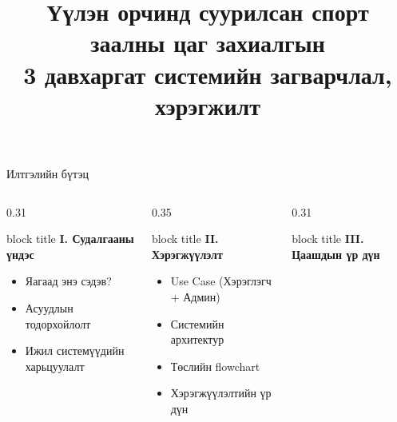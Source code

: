 \documentclass[14pt,aspectratio=169]{beamer}
\title[Спорт заалны цаг захиалгын систем]{%
  Үүлэн орчинд суурилсан спорт заалны цаг захиалгын\\
  3 давхаргат системийн загварчлал, хэрэгжилт}
\author{}
\institute{}
\date{}
\begin{document}

\begin{frame}[plain]
  \titlepage
\end{frame}

\begin{frame}{Илтгэлийн бүтэц}
  \begin{columns}[T]
    \begin{column}{0.31\textwidth}
      \begin{beamercolorbox}[sep=6pt,rounded=true]{block title}
        \centering\textbf{I. Судалгааны үндэс}
      \end{beamercolorbox}
      \vspace{4pt}
      \small
      \begin{itemize}
        \item Яагаад энэ сэдэв?
        \item Асуудлын тодорхойлолт
        \item Ижил системүүдийн харьцуулалт
      \end{itemize}
    \end{column}
    \begin{column}{0.35\textwidth}
      \begin{beamercolorbox}[sep=6pt,rounded=true]{block title}
        \centering\textbf{II. Хэрэгжүүлэлт}
      \end{beamercolorbox}
      \vspace{4pt}
      \small
      \begin{itemize}
        \item Use Case (Хэрэглэгч + Админ)
        \item Системийн архитектур
        \item Төслийн flowchart
        \item Хэрэгжүүлэлтийн үр дүн
      \end{itemize}
    \end{column}
    \begin{column}{0.31\textwidth}
      \begin{beamercolorbox}[sep=6pt,rounded=true]{block title}
        \centering\textbf{III. Цаашдын үр дүн}
      \end{beamercolorbox}
      \vspace{4pt}
      \small
      \begin{itemize}

\end{itemize}
\end{column}
\end{columns}
\end{frame}
\end{document}
